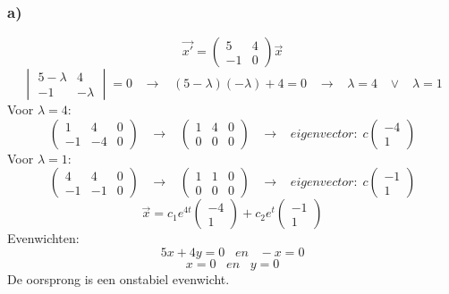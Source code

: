 \documentclass[11pt]{article}
\begin{document}
\subsubsection*{a)}
\[
\vec{x'} = 
\begin{pmatrix}
5 & 4\\
-1 & 0
\end{pmatrix}
\vec{x}
\]
\[
\begin{vmatrix}
5-\lambda & 4 \\
-1 & -\lambda
\end{vmatrix}
=0
\;\;\;\longrightarrow\;\;\;
(5-\lambda)(-\lambda)+4=0
\;\;\;\longrightarrow\;\;\;
\lambda = 4 \;\;\;\vee\;\;\;\lambda = 1
\]
Voor $\lambda = 4$: 
\[
\left(
\begin{array}{cc|c}
1 & 4 & 0 \\
-1 & -4 & 0
\end{array}
\right)
\;\;\;\longrightarrow\;\;\;
\left(
\begin{array}{cc|c}
1 & 4 & 0 \\
0 & 0 & 0
\end{array}
\right)
\;\;\;\longrightarrow\;\;\;
eigenvector:\;
c
\begin{pmatrix}
-4\\1
\end{pmatrix}
\]
Voor $\lambda = 1$: 
\[
\left(
\begin{array}{cc|c}
4 & 4 & 0 \\
-1 & -1 & 0
\end{array}
\right)
\;\;\;\longrightarrow\;\;\;
\left(
\begin{array}{cc|c}
1 & 1 & 0 \\
0 & 0 & 0
\end{array}
\right)
\;\;\;\longrightarrow\;\;\;
eigenvector:\;
c
\begin{pmatrix}
-1\\1
\end{pmatrix}
\]
\[
\vec{x} = c_1e^{4t}\begin{pmatrix}
-4\\1
\end{pmatrix}+c_2e^{t}\begin{pmatrix}
-1\\1
\end{pmatrix}
\]
Evenwichten:
\[
5x+4y=0 \;\;\;en\;\;\; -x=0
\]
\[
x=0 \;\;\;en\;\;\; y=0
\]
De oorsprong is een onstabiel evenwicht.
\end{document}
